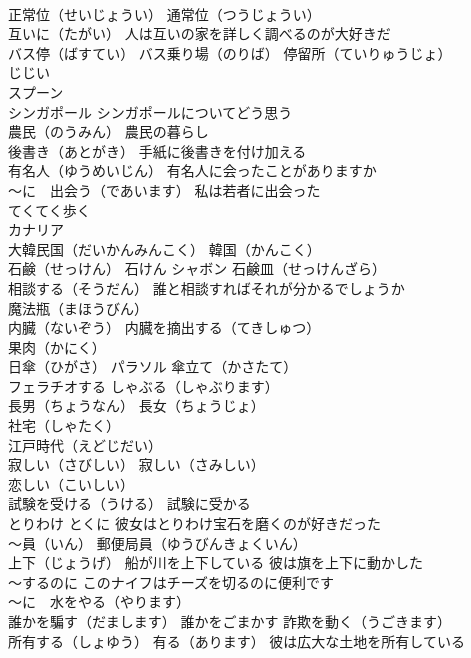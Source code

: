 \documentclass[8pt]{extreport}
\begin{document}
\begin{CJK}{UTF8}{min}
\\	正常位（せいじょうい） 通常位（つうじょうい）
\\	互いに（たがい） 人は互いの家を詳しく調べるのが大好きだ
\\	バス停（ばすてい） バス乗り場（のりば） 停留所（ていりゅうじょ）
\\	じじい
\\	スプーン
\\	シンガポール シンガポールについてどう思う
\\	農民（のうみん） 農民の暮らし
\\	後書き（あとがき） 手紙に後書きを付け加える
\\	有名人（ゆうめいじん） 有名人に会ったことがありますか
\\	～に　出会う（であいます） 私は若者に出会った
\\	てくてく歩く
\\	カナリア
\\	大韓民国（だいかんみんこく） 韓国（かんこく）
\\	石鹸（せっけん） 石けん シャボン 石鹸皿（せっけんざら）
\\	相談する（そうだん） 誰と相談すればそれが分かるでしょうか
\\	魔法瓶（まほうびん）
\\	内臓（ないぞう） 内臓を摘出する（てきしゅつ）
\\	果肉（かにく）
\\	日傘（ひがさ） パラソル 傘立て（かさたて）
\\	フェラチオする しゃぶる（しゃぶります）
\\	長男（ちょうなん） 長女（ちょうじょ）
\\	社宅（しゃたく）
\\	江戸時代（えどじだい） 
\\	寂しい（さびしい） 寂しい（さみしい） 
\\	恋しい（こいしい） 
\\	試験を受ける（うける） 試験に受かる
\\	とりわけ とくに 彼女はとりわけ宝石を磨くのが好きだった
\\	～員（いん） 郵便局員（ゆうびんきょくいん）
\\	上下（じょうげ） 船が川を上下している 彼は旗を上下に動かした
\\	～するのに このナイフはチーズを切るのに便利です
\\	～に　水をやる（やります）
\\	誰かを騙す（だまします） 誰かをごまかす 詐欺を動く（うごきます）
\\	所有する（しょゆう） 有る（あります） 彼は広大な土地を所有している

\end{CJK}
\end{document}
